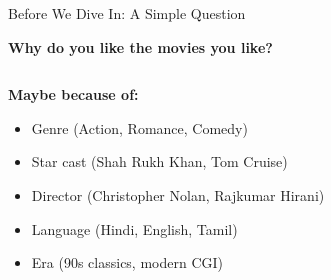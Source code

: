 \documentclass{beamer}
\begin{document}
\begin{frame}{Before We Dive In: A Simple Question}
\begin{center}
\Large \textbf{Why do you like the movies you like?}
\end{center}

\pause
\begin{columns}[T]
\begin{column}{0.5\textwidth}
\textbf{Maybe because of:}
\begin{itemize}[<+->]
    \item Genre (Action, Romance, Comedy)
    \item Star cast (Shah Rukh Khan, Tom Cruise)
    \item Director (Christopher Nolan, Rajkumar Hirani)
    \item Language (Hindi, English, Tamil)
    \item Era (90s classics, modern CGI)
\end{itemize}
\end{column}
\begin{column}{0.5\textwidth}
\end{column}
\end{columns}
\end{frame}
\end{document}
